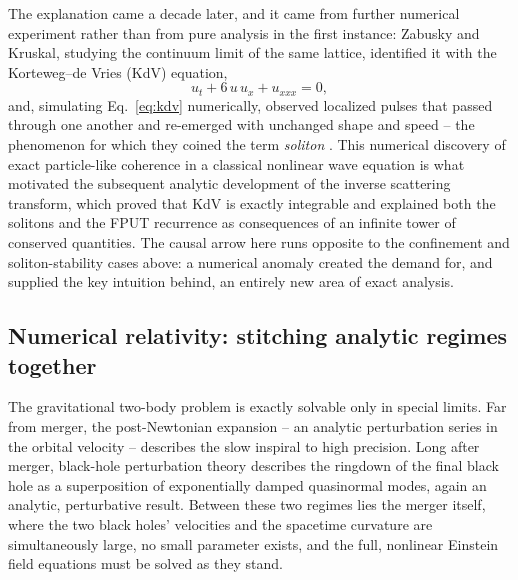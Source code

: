 \documentclass[11pt]{article}
\begin{document}
The explanation came a decade later, and it came from further numerical experiment rather than from pure analysis in the first instance: Zabusky and Kruskal, studying the continuum limit of the same lattice, identified it with the Korteweg--de Vries (KdV) equation,
\begin{equation}
u_t + 6\,u\,u_x + u_{xxx} = 0,
\label{eq:kdv}
\end{equation}
and, simulating Eq.~\eqref{eq:kdv} numerically, observed localized pulses that passed through one another and re-emerged with unchanged shape and speed -- the phenomenon for which they coined the term \emph{soliton} \cite{ZabuskyKruskal1965}. This numerical discovery of exact particle-like coherence in a classical nonlinear wave equation is what motivated the subsequent analytic development of the inverse scattering transform, which proved that KdV is exactly integrable and explained both the solitons and the FPUT recurrence as consequences of an infinite tower of conserved quantities. The causal arrow here runs opposite to the confinement and soliton-stability cases above: a numerical anomaly created the demand for, and supplied the key intuition behind, an entirely new area of exact analysis.

\subsection{Numerical relativity: stitching analytic regimes together}

The gravitational two-body problem is exactly solvable only in special limits. Far from merger, the post-Newtonian expansion -- an analytic perturbation series in the orbital velocity -- describes the slow inspiral to high precision. Long after merger, black-hole perturbation theory describes the ringdown of the final black hole as a superposition of exponentially damped quasinormal modes, again an analytic, perturbative result. Between these two regimes lies the merger itself, where the two black holes' velocities and the spacetime curvature are simultaneously large, no small parameter exists, and the full, nonlinear Einstein field equations must be solved as they stand.
\end{document}
